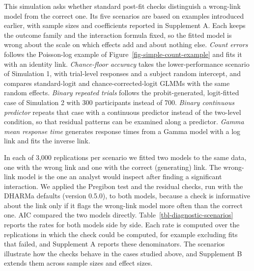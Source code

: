 \documentclass[
  man,
  floatsintext,
  longtable,
  nolmodern,
  notxfonts,
  notimes,
  colorlinks=true,linkcolor=blue,citecolor=blue,urlcolor=blue]{apa7}
\begin{document}
This simulation asks whether standard post-fit checks distinguish a
wrong-link model from the correct one. Its five scenarios are based on
examples introduced earlier, with sample sizes and coefficients reported
in Supplement A. Each keeps the outcome family and the interaction
formula fixed, so the fitted model is wrong about the scale on which
effects add and about nothing else. \emph{Count errors} follows the
Poisson-log example of Figure~\ref{fig-simple-count-example} and fits it
with an identity link. \emph{Chance-floor accuracy} takes the
lower-performance scenario of Simulation 1, with trial-level responses
and a subject random intercept, and compares standard-logit and
chance-corrected-logit GLMMs with the same random effects. \emph{Binary
repeated trials} follows the probit-generated, logit-fitted case of
Simulation 2 with 300 participants instead of 700. \emph{Binary
continuous predictor} repeats that case with a continuous predictor
instead of the two-level condition, so that residual patterns can be
examined along a predictor. \emph{Gamma mean response time} generates
response times from a Gamma model with a log link and fits the inverse
link.

In each of 3,000 replications per scenario we fitted two models to the
same data, one with the wrong link and one with the correct (generating)
link. The wrong-link model is the one an analyst would inspect after
finding a significant interaction. We applied the Pregibon test and the
residual checks, run with the DHARMa defaults (version 0.5.0), to both
models, because a check is informative about the link only if it flags
the wrong-link model more often than the correct one. AIC compared the
two models directly. Table~\ref{tbl-diagnostic-scenarios} reports the
rates for both models side by side. Each rate is computed over the
replications in which the check could be computed, for example excluding
fits that failed, and Supplement A reports these denominators. The
scenarios illustrate how the checks behave in the cases studied above,
and Supplement B extends them across sample sizes and effect sizes.
\end{document}
